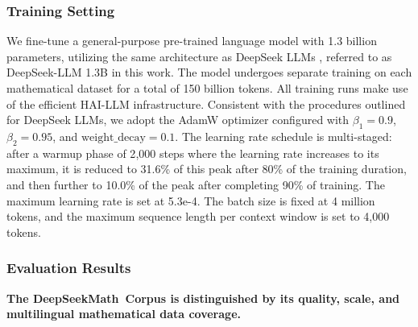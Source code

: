 \subsubsection{Training Setting}
\label{sec:quality-policy}
We fine-tune a general-purpose pre-trained language model with 1.3 billion parameters, utilizing the same architecture as DeepSeek LLMs \citep{deepseek-llm}, referred to as DeepSeek-LLM 1.3B in this work. The model undergoes separate training on each mathematical dataset for a total of 150 billion tokens. All training runs make use of the efficient HAI-LLM \citep{haillm} infrastructure. Consistent with the procedures outlined for DeepSeek LLMs, we adopt the AdamW optimizer \citep{adamW} configured with $\beta_1=0.9$, $\beta_2=0.95$, and $\mathrm{weight\_decay}=0.1$. The learning rate schedule is multi-staged: after a warmup phase of 2{,}000 steps where the learning rate increases to its maximum, it is reduced to 31.6\% of this peak after 80\% of the training duration, and then further to 10.0\% of the peak after completing 90\% of training. The maximum learning rate is set at 5.3e-4. The batch size is fixed at 4 million tokens, and the maximum sequence length per context window is set to 4{,}000 tokens.

\subsubsection{Evaluation Results}

\textbf{The DeepSeekMath~Corpus is distinguished by its quality, scale, and multilingual mathematical data coverage.}

